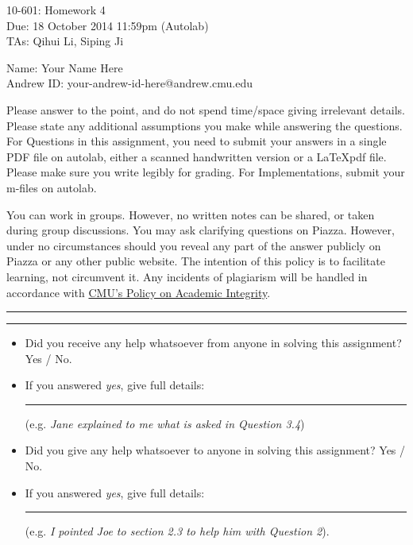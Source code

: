 \documentclass[11pt]{article}
\makeatletter
\newif\ifprint
\newcommand{\mycoursenum}{10-601}
\newcommand{\myhwnum}{4}
\newcommand{\myname}{Your Name Here}
\newcommand{\myandrew}{your-andrew-id-here@andrew.cmu.edu}
\newcommand{\myfirstta}{Qihui Li}
\newcommand{\mysecondta}{Siping Ji}
\newcommand{\question}[2] {\vspace{.25in} \hrule\vspace{0.5em} \noindent{\bf #1: #2} \vspace{0.5em} \hrule \vspace{.10in}}
\makeatother
\begin{document}
\medskip

\thispagestyle{plain}
\begin{center}
{\Large \mycoursenum: Homework \myhwnum} \\
Due: 18 October 2014 11:59pm (Autolab) \\
TAs: \myfirstta, \mysecondta \\
\medskip
\ifprint
Name: \rule{0.5\textwidth}{.4pt} \\
Andrew ID: \rule{0.45\textwidth}{.4pt} \\
\else
Name: \myname \\
Andrew ID: \myandrew \\
\fi
\end{center}

Please answer to the point, and do not spend time/space giving irrelevant details. 
Please state any additional assumptions you make while answering the questions. 
For Questions in this assignment, you need to submit your answers in a single PDF file on autolab, either a scanned handwritten version or a \LaTeX pdf file. 
Please make sure you write legibly for grading.
For Implementations, submit your m-files on autolab. 

You can work in groups. However, no written notes can be shared, or taken during group discussions. You may ask clarifying questions on Piazza. However, under no circumstances should you reveal any part of the answer publicly on Piazza or any other public website. The intention of this policy is to facilitate learning, not circumvent it. Any incidents of plagiarism will be handled in accordance with \href{http://www.cmu.edu/policies/documents/Academic%20Integrity.htm}{CMU's Policy on Academic Integrity}.


\question{$\star$}{Code of Conduct Declaration}

\begin{itemize}
	\item Did you receive any help whatsoever from anyone in solving this assignment? Yes / No.
	\item If you answered \emph{yes}, give full details: \rule{0.4\textwidth}{.4pt} (e.g. \emph{Jane explained to me what is asked in Question 3.4})
	\item Did you give any help whatsoever to anyone in solving this assignment? Yes / No.
	\item If you answered \emph{yes}, give full details: \rule{0.4\textwidth}{.4pt} (e.g. \emph{I pointed Joe to section 2.3 to help him with Question 2}).
\end{itemize}
\end{document}
